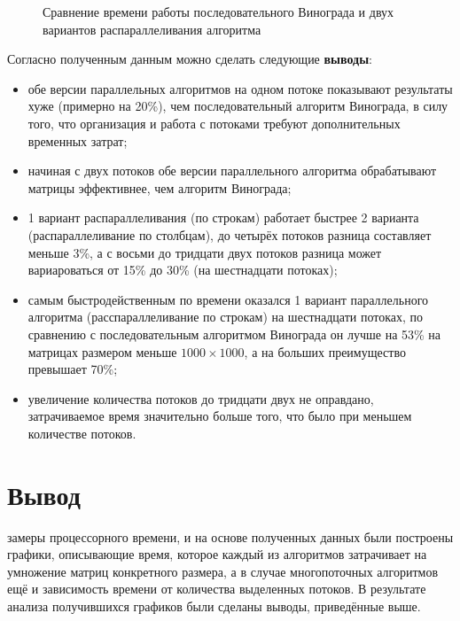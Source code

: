 \begin{figure}[h]
\caption{Сравнение времени работы последовательного Винограда и двух вариантов распараллеливания алгоритма}
\label{fig6:graph}
\end{figure}

\newpage

Согласно полученным данным можно сделать следующие \textbf{выводы}:
\begin{itemize}
	\item обе версии параллельных алгоритмов на одном потоке показывают результаты хуже (примерно на 20\%), чем последовательный алгоритм Винограда, в силу того, что организация и работа с потоками требуют дополнительных временных затрат;
	\item начиная с двух потоков обе версии параллельного алгоритма обрабатывают матрицы эффективнее, чем алгоритм Винограда;
	\item 1 вариант распараллеливания (по строкам) работает быстрее 2 варианта (распараллеливание по столбцам), до четырёх потоков разница составляет меньше 3\%, а с восьми до тридцати двух потоков разница может вариароваться от 15\% до 30\% (на шестнадцати потоках);
	\item самым быстродейственным по времени оказался 1 вариант параллельного алгоритма (расспараллеливание по строкам) на шестнадцати потоках, по сравнению с последовательным алгоритмом Винограда он лучше на 53\% на матрицах размером меньше $1000 \times 1000$, а на больших преимущество превышает 70\%;
	\item увеличение количества потоков до тридцати двух не оправдано, затрачиваемое время значительно больше того, что было при меньшем количестве потоков.
	\end{itemize}

\section*{Вывод}
 замеры процессорного времени, и на основе полученных данных были построены графики, описывающие время, которое каждый из алгоритмов затрачивает на умножение матриц конкретного размера, а в случае многопоточных алгоритмов ещё и зависимость времени от количества выделенных потоков. В результате анализа получившихся графиков были сделаны выводы, приведённые выше.


